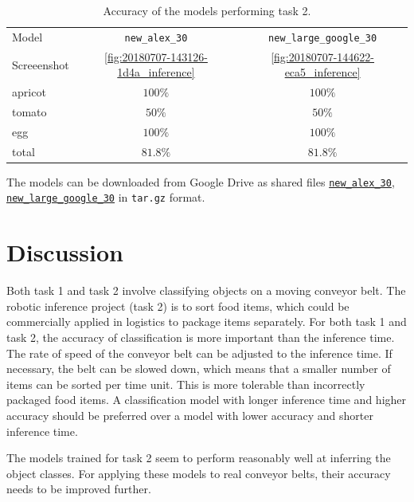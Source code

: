 \documentclass[10pt, journal, compsoc]{IEEEtran}
\begin{document}
\begin{table}[htpb]
\caption{Accuracy of the models performing task 2.}
\label{tab:performance}
\begin{center}
\renewcommand{\arraystretch}{1.3}
\begin{tabular}{|l|c|c|}
\hline
Model & \texttt{new\_alex\_30} &\texttt{new\_large\_google\_30} \\
Screeenshot & \ref{fig:20180707-143126-1d4a_inference}& \ref{fig:20180707-144622-eca5_inference} \\
\hline
apricot  & $100\%$ &  $100\%$ \\
tomato   &  $50\%$ &  $50\%$  \\
egg      & $100\%$ & $100\%$ \\
\hline
total   & $81.8\%$  &  $81.8\%$\\
\hline
\end{tabular}
\end{center}
\end{table}

The models can be downloaded from Google Drive as shared files \href{https://drive.google.com/file/d/1zU4CfHpNheldrA8mJpPxxSZZS4ccLhVd/view?usp=sharing}{\texttt{new\_alex\_30}}, \href{https://drive.google.com/file/d/1mXt7rjXCMxZOcso7pLWbNrA-efT7cA7X/view?usp=sharing}{\texttt{new\_large\_google\_30}} in \texttt{tar.gz} format.

\section{Discussion}
\label{sec:discussion}
Both task 1 and task 2 involve classifying objects on a moving conveyor belt. The robotic inference project (task 2) is to sort food items, which could be commercially applied in logistics to package items separately. For both task 1 and task 2, the accuracy of classification is more important than the inference time. The rate of speed of the conveyor belt can be adjusted to the inference time. If necessary, the belt can be slowed down, which means that a smaller number of items can be sorted per time unit. This is more tolerable than incorrectly packaged food items. A classification model with longer inference time and higher accuracy should be preferred over a model with lower accuracy and shorter inference time. 

The models trained for task 2 seem to perform reasonably well at inferring the object classes. For applying these models to real conveyor belts, their accuracy needs to be improved further.
\end{document}

